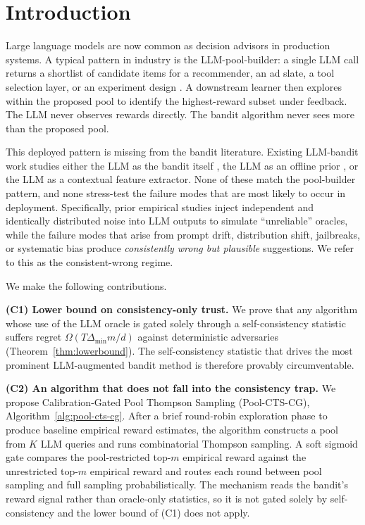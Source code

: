 \documentclass{article}
\theoremstyle{plain}
\theoremstyle{definition}
\theoremstyle{remark}
\newcommand{\gap}{\Delta_{\min}}
\newcommand{\algname}{Pool-CTS-CG}
\newcommand{\algfull}{Calibration-Gated Pool Thompson Sampling}
\begin{document}
\section{Introduction}
\label{sec:intro}

Large language models are now common as decision advisors in production systems. A typical pattern in industry is the LLM-pool-builder: a single LLM call returns a shortlist of candidate items for a recommender, an ad slate, a tool selection layer, or an experiment design \citep{liu2024llambo,bayley2025jumpstart,alamdari2024jumpstarting}. A downstream learner then explores within the proposed pool to identify the highest-reward subset under feedback. The LLM never observes rewards directly. The bandit algorithm never sees more than the proposed pool.

This deployed pattern is missing from the bandit literature. Existing LLM-bandit work studies either the LLM as the bandit itself \citep{krishnamurthy2024canllms,nie2024evolve}, the LLM as an offline prior \citep{bayley2025jumpstart,alamdari2024jumpstarting}, or the LLM as a contextual feature extractor. None of these match the pool-builder pattern, and none stress-test the failure modes that are most likely to occur in deployment. Specifically, prior empirical studies inject independent and identically distributed noise into LLM outputs to simulate ``unreliable'' oracles, while the failure modes that arise from prompt drift, distribution shift, jailbreaks, or systematic bias produce \emph{consistently wrong but plausible} suggestions. We refer to this as the consistent-wrong regime.

We make the following contributions.

\textbf{(C1) Lower bound on consistency-only trust.} We prove that any algorithm whose use of the LLM oracle is gated solely through a self-consistency statistic suffers regret $\Omega(T \gap m / d)$ against deterministic adversaries (Theorem~\ref{thm:lowerbound}). The self-consistency statistic that drives the most prominent LLM-augmented bandit method is therefore provably circumventable.

\textbf{(C2) An algorithm that does not fall into the consistency trap.} We propose \algfull{} (\algname{}), Algorithm~\ref{alg:pool-cts-cg}. After a brief round-robin exploration phase to produce baseline empirical reward estimates, the algorithm constructs a pool from $K$ LLM queries and runs combinatorial Thompson sampling. A soft sigmoid gate compares the pool-restricted top-$m$ empirical reward against the unrestricted top-$m$ empirical reward and routes each round between pool sampling and full sampling probabilistically. The mechanism reads the bandit's reward signal rather than oracle-only statistics, so it is not gated solely by self-consistency and the lower bound of (C1) does not apply.
\end{document}
